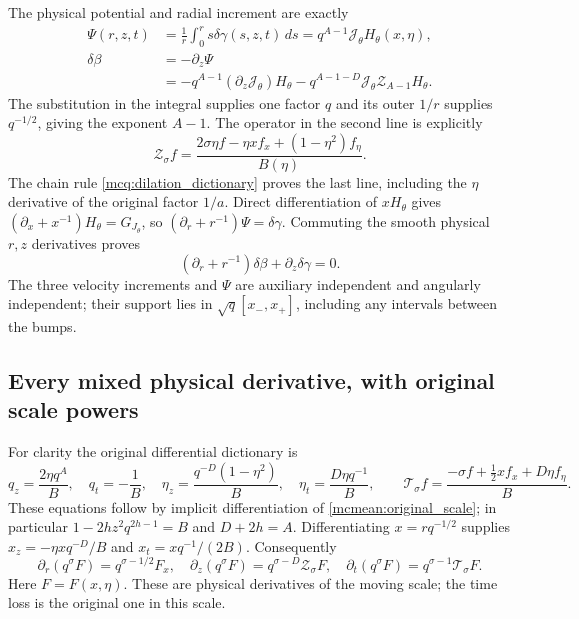 The physical potential and radial increment are exactly
\begin{equation}\label{mcmean:potential_radial}
\begin{split}
 \Psi(r,z,t)&=\frac1r\int_0^r s\delta\gamma(s,z,t)\,ds
             =q^{A-1}\mathcal J_\theta H_\theta(x,\eta),\\
 \delta\beta&=-\partial_z\Psi\\
 &=-q^{A-1}(\partial_z\mathcal J_\theta)H_\theta
   -q^{A-1-D}\mathcal J_\theta\mathcal Z_{A-1}H_\theta.
\end{split}
\end{equation}
The substitution in the integral supplies one factor \(q\) and its
outer \(1/r\) supplies \(q^{-1/2}\), giving the exponent \(A-1\).
The operator in the second line is explicitly
\[
 \mathcal Z_\sigma f
 =\frac{2\sigma\eta f-\eta x f_x+(1-\eta^2)f_\eta}{B(\eta)}.
\]
The chain rule \eqref{mcq:dilation_dictionary} proves the last line,
including the \(\eta\) derivative of the original factor \(1/a\).
Direct differentiation of \(xH_\theta\) gives
\((\partial_x+x^{-1})H_\theta=G_{J_\theta}\), so
\((\partial_r+r^{-1})\Psi=\delta\gamma\). Commuting the smooth
physical \(r,z\) derivatives proves
\begin{equation}\label{mcmean:divergence}
 (\partial_r+r^{-1})\delta\beta+\partial_z\delta\gamma=0.
\end{equation}
The three velocity increments and \(\Psi\) are auxiliary independent
and angularly independent; their support lies in
\(\sqrt q[x_-,x_+]\), including any intervals between the bumps.

\subsection{Every mixed physical derivative, with original scale powers}

For clarity the original differential dictionary is
\[
 q_z=\frac{2\eta q^A}{B},\quad q_t=-\frac1B,\quad
 \eta_z=\frac{q^{-D}(1-\eta^2)}B,\quad
 \eta_t=\frac{D\eta q^{-1}}B,
 \qquad
 \mathcal T_\sigma f=
 \frac{-\sigma f+\tfrac12x f_x+D\eta f_\eta}{B}.
\]
These equations follow by implicit differentiation of
\eqref{mcmean:original_scale}; in particular
\(1-2hz^2q^{2h-1}=B\) and \(D+2h=A\).
Differentiating \(x=rq^{-1/2}\) supplies
\(x_z=-\eta xq^{-D}/B\) and \(x_t=xq^{-1}/(2B)\).
Consequently
\[
 \partial_r(q^\sigma F)=q^{\sigma-1/2}F_x,\quad
 \partial_z(q^\sigma F)=q^{\sigma-D}\mathcal Z_\sigma F,\quad
 \partial_t(q^\sigma F)=q^{\sigma-1}\mathcal T_\sigma F.
\]
Here \(F=F(x,\eta)\). These are physical derivatives of the moving
scale; the time loss is the original one in this scale.

